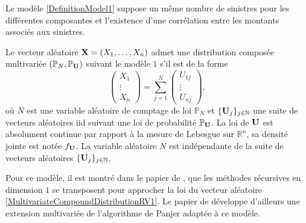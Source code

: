 Le modèle \ref{DefinitionModel1} suppose un même nombre de sinistres pour les différentes composantes et l\rq{}existence d\rq{}une corrélation entre les montants associés aux sinistres. 
\begin{Mod}\label{DefinitionModel1}
Le vecteur aléatoire $\bold{X}=(X_{1},\ldots,X_{n})$ admet une distribution composée multivariée $(\mathbb{P}_{N},\mathbb{P}_\bold{U})$ suivant le modèle $1$ s\rq{}il est de la forme
\begin{equation}\label{MultivariateCompoundDistributionRV1}
\left( \begin{array}{l}
X_1 \\
\vdots\\
X_n \end{array}
\right)  =
 \displaystyle
\sum_{j=1}^{N}
\left( \begin{array}{l}
U_{1j} \\
\vdots\\
U_{nj} 
\end{array}
\right),
\end{equation}
où $N$ est une variable aléatoire de comptage de loi $\mathbb{P}_{N}$ et $\{\bold{U}_{j}\}_{j\in\mathbb{N}}$ une suite de vecteurs aléatoires \gls{iid} suivant une loi de probabilité $\mathbb{P}_{\bold{U}}$. La loi de $\bold{U}$ est absolument continue par rapport à la mesure de Lebesgue sur $\mathbb{R}^{n}$, sa densité jointe est notée $f_{\bold{U}}$. La variable aléatoire $N$ est indépendante de la suite de vecteurs aléatoires $\{\bold{U}_{j}\}_{j\in\mathbb{N}}$.
\end{Mod}
Pour ce modèle, il est montré dans le papier de \citet{Am99}, que les méthodes récursives en dimension $1$ se transposent pour approcher la loi du vecteur aléatoire \eqref{MultivariateCompoundDistributionRV1}. Le papier de \citet{Su99} développe d\rq{}ailleurs une extension multivariée de l\rq{}algorithme de Panjer adaptée à ce modèle.\\

